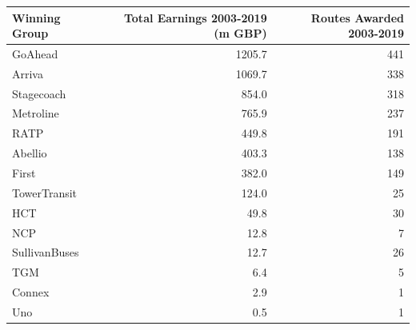 \begin{tabular}[t]{lrr}
\toprule
Winning Group & Total Earnings 2003-2019 (m GBP) & Routes Awarded 2003-2019\\
\midrule
GoAhead & 1205.7 & 441\\
Arriva & 1069.7 & 338\\
Stagecoach & 854.0 & 318\\
Metroline & 765.9 & 237\\
RATP & 449.8 & 191\\
\addlinespace
Abellio & 403.3 & 138\\
First & 382.0 & 149\\
TowerTransit & 124.0 & 25\\
HCT & 49.8 & 30\\
NCP & 12.8 & 7\\
\addlinespace
SullivanBuses & 12.7 & 26\\
TGM & 6.4 & 5\\
Connex & 2.9 & 1\\
Uno & 0.5 & 1\\
\bottomrule
\end{tabular}
